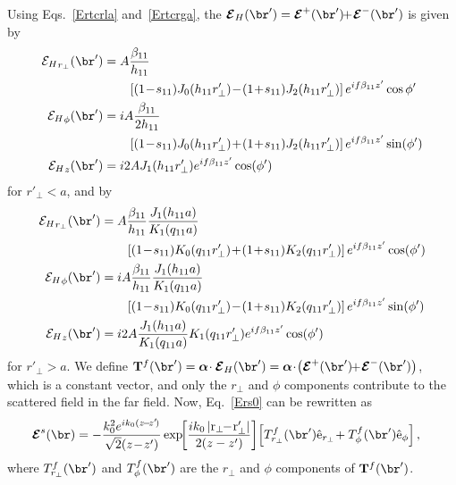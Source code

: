 Using Eqs.~\ref{Ertcrla} and~\ref{Ertcrga}, the $ \boldsymbol{\mathcal{E}}_H (\br')= \boldsymbol{\mathcal{E}}^+ (\br') \!\! +\! \boldsymbol{\mathcal{E}}^- (\br') $ is given by
\begin{subequations}
\label{EHrcrla}
\begin{align}
{\mathcal{E}_H}_{r_\perp} (\br') &= A\frac{\beta_{11}}{h_{11}}\nonumber\\
&\qquad \left[ (1\!-\!s_{11})J_0(h_{11}r'_\perp)\!-\! (1\!+\!s_{11})J_2(h_{11}r_\perp') \right]e^{if\beta_{11} z'}\cos{\phi'}\\
{\mathcal{E}_H}_\phi(\br') &=  iA \frac{\beta_{11}}{2h_{11}} \nonumber\\
&\qquad \left[ (1\!-\!s_{11})J_0(h_{11}r'_\perp)\! +\! (1\!+\!s_{11})J_2(h_{11}r'_\perp) \right] e^{if\beta_{11} z' }\sin(\phi')\\
{\mathcal{E}_H}_z(\br') &= i2A J_1(h_{11}r'_\perp) e^{if\beta_{11} z'}\cos(\phi')
\end{align}
\end{subequations}
for $ r'_\perp<a $, and by
\begin{subequations}
\label{EHrpcrga}
\begin{align}
{\mathcal{E}_H}_{r_\perp}(\br') &=A\frac{\beta_{11}}{h_{11}}\frac{J_1(h_{11}a)}{K_1(q_{11}a)}\nonumber\\ 
&\qquad \left[ (1\!-\!s_{11})K_0(q_{11}r'_\perp)\!+\!(1 \!+\! s_{11})K_2(q_{11}r'_\perp) \right]e^{if\beta_{11} z' }\cos(\phi')\\
{\mathcal{E}_H}_\phi(\br') &=  iA \frac{\beta_{11}}{h_{11}} \frac{J_1(h_{11}a)}{K_1(q_{11}a)}\nonumber\\ 
&\qquad \left[ (1\!-\!s_{11})K_0(q_{11}r'_\perp) \! -\! (1\!+\!s_{11})K_2(q_{11}r'_\perp) \right] e^{if\beta_{11} z'}\sin(\phi')\\
{\mathcal{E}_H}_z(\br') &= i2A \frac{J_1(h_{11}a)}{K_1(q_{11}a)} K_1(q_{11}r'_\perp) e^{if\beta_{11} z'}\cos(\phi')
\end{align}
\end{subequations}
for $ r'_\perp>a $. We define $ \mathbf{T}^{f}(\br')= \boldsymbol{\alpha}\!\cdot \boldsymbol{\mathcal{E}}_H (\br') = \boldsymbol{\alpha}\!\cdot\! \left(\boldsymbol{\mathcal{E}}^+ (\br') \!\! +\! \boldsymbol{\mathcal{E}}^- (\br') \right) $, which is a constant vector, and only the $ r_\perp $ and $ \phi $ components contribute to the scattered field in the far field. Now, Eq.~\ref{Ers0} can be rewritten as
\begin{align}
\boldsymbol{\mathcal{E}}^s(\br) &=- \frac{k_0^2 e^{ik_0(z\!-\!z'\!)}}{\sqrt{2}(z\!-\!z')} \exp\!\! \left[ \frac{ik_0 \left| \mathrm{r}_\perp\!\! -\! \mathrm{r}_\perp'\right|}{2(z-z')}  \right]\! \left[ T_{r_\perp}^f(\br') \hat{\mathrm{e}}_{r_\perp} \! + T^f_\phi (\br') \hat{\mathrm{e}}_{\phi} \right],
\end{align}
where $ T^f_{r_\perp}(\br') $ and $ T^f_\phi (\br') $ are the $ r_\perp $ and $ \phi $ components of $ \mathbf{T}^f(\br')$. 

